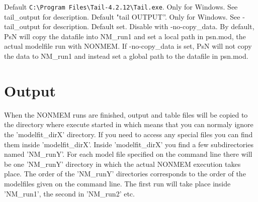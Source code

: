 \begin{optionlist}
\nextopt
{}
Default \verb|C:\Program Files\Tail-4.2.12\Tail.exe|. Only for Windows. See tail\_output for description.
\nextopt
{}
Default "tail OUTPUT”. Only for Windows. See -tail\_output for description.
\nextopt
{}
Default set. Disable with -no-copy\_data. By default, PsN will copy the datafile into NM\_run1 and set a local path in psn.mod, the actual modelfile run with NONMEM. If -no-copy\_data is set, PsN will not copy the data to NM\_run1 and instead set a global path to the datafile in psn.mod.
\nextopt
\end{optionlist}

\section{Output}
When the NONMEM runs are finished, output and table files will be copied to the directory where execute started in which means that you can normaly ignore the 'modelfit\_dirX' directory. If you need to access any special files you can find them inside 'modelfit\_dirX'. Inside 'modelfit\_dirX' you find a few subdirectories named 'NM\_runY'. For each model file specified on the command line there will be one 'NM\_runY' directory in which the actual NONMEM execution takes place. The order of the 'NM\_runY' directories corresponds to the order of the modelfiles given on the command line. The first run will take place inside 'NM\_run1', the second in 'NM\_run2' etc.




